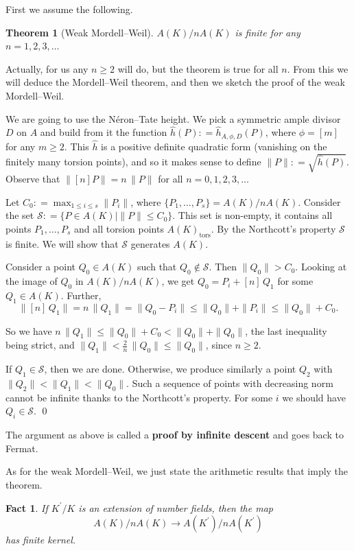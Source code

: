 \documentclass{article}
\newtheorem{fact}[proposition]{Fact}
\newtheorem{theorem}[proposition]{Theorem}
\theoremstyle{definition}
\newcommand{\term}{\textbf}
\newcommand{\dfn}{\mathrel{\mathop:}=}
\begin{document}
First we assume the following.

\begin{theorem}[Weak Mordell--Weil]
  $A (K) / n A (K)$ is finite for any $n = 1,2,3,\ldots$
\end{theorem}

Actually, for us any $n \ge 2$ will do, but the theorem is true for all $n$.
From this we will deduce the Mordell--Weil theorem, and then we sketch the proof
of the weak Mordell--Weil.

We are going to use the N\'eron--Tate height. We pick a symmetric ample divisor
$D$ on $A$ and build from it the function
$\widehat{h} (P) \dfn \widehat{h}_{A,\phi,D} (P)$, where $\phi = [m]$ for any
$m \ge 2$. This $\widehat{h}$ is a positive definite quadratic form (vanishing
on the finitely many torsion points), and so it makes sense to define
$\|P\| \dfn \sqrt{\widehat{h} (P)}$. Observe that $\| [n] P \| = n \, \|P\|$
for all $n = 0,1,2,3,\ldots$

Let $C_0 \dfn \max_{1 \le i \le s} \| P_i \|$, where
$\{ P_1, \ldots, P_s \} = A (K) / n A (K)$. Consider the set
$\mathcal{S} \dfn \{ P \in A (K) \mid \|P\| \le C_0 \}$. This set is non-empty,
it contains all points $P_1, \ldots, P_s$ and all torsion points
$A (K)_\mathrm{tors}$. By the Northcott's property $\mathcal{S}$ is finite.
We will show that $\mathcal{S}$ generates $A (K)$.

Consider a point $Q_0 \in A (K)$ such that $Q_0 \notin \mathcal{S}$. Then
$\|Q_0\| > C_0$. Looking at the image of $Q_0$ in $A (K) / n A(K)$, we get
$Q_0 = P_i + [n]\,Q_1$ for some $Q_1 \in A (K)$. Further,
$$\| [n] \, Q_1 \| = n\,\|Q_1\| = \|Q_0 - P_i\| \le \|Q_0\| + \|P_i\| \le \|Q_0\| + C_0.$$

So we have $n\,\|Q_1\| \le \|Q_0\| + C_0 < \|Q_0\| + \|Q_0\|$, the last
inequality being strict, and $\|Q_1\| < \frac{2}{n}\,\|Q_0\| \le \|Q_0\|$, since
$n \ge 2$.

If $Q_1 \in \mathcal{S}$, then we are done. Otherwise, we produce similarly a
point $Q_2$ with $\|Q_2\| < \|Q_1\| < \|Q_0\|$. Such a sequence of points with
decreasing norm cannot be infinite thanks to the Northcott's property. For some
$i$ we should have $Q_i \in \mathcal{S}$. \qed

The argument as above is called a \term{proof by infinite descent} and goes back
to Fermat.

As for the weak Mordell--Weil, we just state the arithmetic results that imply
the theorem.

\begin{fact}
  If $K^\prime/K$ is an extension of number fields, then the map
  $$A (K)/n A(K) \to A(K^\prime)/n A(K^\prime)$$
  has finite kernel.
\end{fact}
\end{document}
